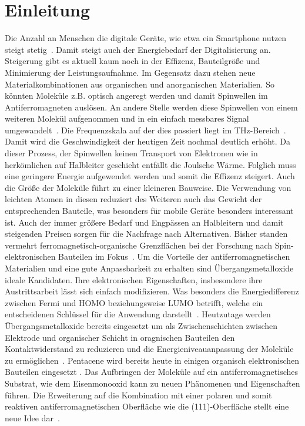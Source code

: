 \chapter{Einleitung}
    Die Anzahl an Menschen die digitale Geräte, wie etwa ein Smartphone nutzen steigt stetig~\cite{Statista}.
    Damit steigt auch der Energiebedarf der Digitalisierung an.
    Steigerung gibt es aktuell kaum noch in der Effizenz, Bauteilgröße und Minimierung der Leistungsaufnahme.
    Im Gegensatz dazu stehen neue Materialkombinationen aus organischen und anorganischen Materialien.
    So könnten Moleküle z.B. optisch angeregt werden und damit Spinwellen im Antiferromagneten auslösen. 
    An andere Stelle werden diese Spinwellen von einem weiteren Molekül aufgenommen und in ein einfach messbares Signal umgewandelt~\cite{SINFONIA}.
    Die Frequenzskala auf der dies passiert liegt im \si{\tera\hertz}-Bereich~\cite{AFM_5}.
    Damit wird die Geschwindigkeit der heutigen Zeit nochmal deutlich erhöht.
    Da dieser Prozess, der Spinwellen keinen Transport von Elektronen wie in herkömlichen auf Halbleiter geschieht entfällt die Joulsche Wärme.
    Folglich muss eine geringere Energie aufgewendet werden und somit die Effizenz steigert.
    Auch die Größe der Moleküle führt zu einer kleineren Bauweise.
    Die Verwendung von leichten Atomen in diesen reduziert des Weiteren auch das Gewicht der entsprechenden Bauteile, was besonders für mobile Geräte besonders interessant ist.
    Auch der immer größere Bedarf und Engpässen an Halbleitern \cite{Idealo} und damit steigenden Preisen sorgen für die Nachfrage nach Alternativen.
    Bisher standen vermehrt ferromagnetisch-organische Grenzflächen bei der Forschung nach Spin-elektronischen Bauteilen im Fokus~\cite{ma-DJ}.
    Um die Vorteile der antiferromagnetischen Materialien und eine gute Anpassbarkeit zu erhalten sind Übergangsmetalloxide ideale Kandidaten.
    Ihre elektronischen Eigenschaften, insbesondere ihre Austrittsarbeit lässt sich einfach modifizieren.
    Was besonders die Energiedifferenz zwischen Fermi und HOMO beziehungsweise LUMO betrifft, welche ein entscheidenen Schlüssel für die Anwendung darstellt~\cite{5A_4}.
    Heutzutage werden Übergangsmetalloxide bereits eingesetzt um als Zwischenschichten zwischen Elektrode und organischer Schicht in oragnischen Bauteilen den Kontaktwiderstand zu reduzieren und die Energieniveauanpassung der Moleküle zu ermöglichen~\cite{IF_11}.
    Pentacene wird bereits heute in einigen organisch elektronischen Bauteilen eingesetzt \cite{5A_4}.
    Das Aufbringen der Moleküle auf ein antiferromagnetisches Substrat, wie dem Eisenmonooxid kann zu neuen Phänomenen und Eigenschaften führen.
    Die Erweiterung auf die Kombination mit einer polaren und somit reaktiven antiferromagnetischen Oberfläche wie die  (111)-Oberfläche stellt eine neue Idee dar~\cite{cappus_hydroxyl_1993}.


